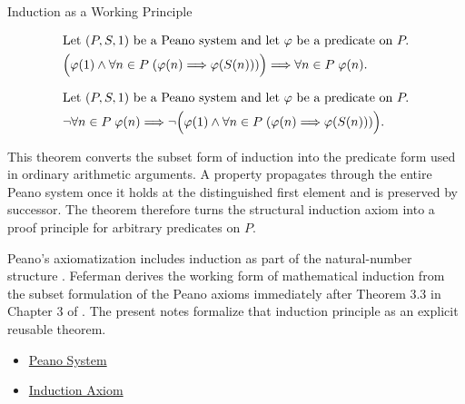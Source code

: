 \begin{topicbox}{Induction as a Working Principle}
\begin{remark*}
\[
\begin{aligned}
&\text{Let } (P,S,1) \text{ be a Peano system and let } \varphi
\text{ be a predicate on } P.\\
&\Bigl(\varphi(1) \land
\forall n \in P\;(\varphi(n) \Longrightarrow \varphi(S(n)))\Bigr)
\Longrightarrow
\forall n \in P\;\varphi(n).
\end{aligned}
\]
\end{remark*}

\begin{remark*}
\[
\begin{aligned}
&\text{Let } (P,S,1) \text{ be a Peano system and let } \varphi
\text{ be a predicate on } P.\\
&\neg\forall n \in P\;\varphi(n)
\Longrightarrow
\neg\Bigl(\varphi(1) \land
\forall n \in P\;(\varphi(n) \Longrightarrow \varphi(S(n)))\Bigr).
\end{aligned}
\]
\end{remark*}

\begin{remark*}[Interpretation]
This theorem converts the subset form of induction into the predicate form
used in ordinary arithmetic arguments. A property propagates through the
entire Peano system once it holds at the distinguished first element and is
preserved by successor. The theorem therefore turns the structural induction
axiom into a proof principle for arbitrary predicates on $P$.
\end{remark*}

\begin{remark*}
Peano's axiomatization includes induction as part of the natural-number
structure \citep{PeanoArithmeticesPrincipia1889}. Feferman derives the
working form of mathematical induction from the subset formulation of the
Peano axioms immediately after Theorem 3.3 in Chapter 3 of
\citet{FefermanNumberSystems1964}. The present notes formalize that
induction principle as an explicit reusable theorem.
\end{remark*}

\begin{dependencies}
\begin{itemize}
  \item \hyperref[def:peano-system]{Peano System}
  \item \hyperref[ax:peano-induction]{Induction Axiom}
\end{itemize}
\end{dependencies}
\end{topicbox}

